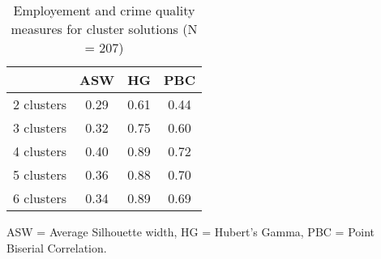 \begin{table}[htp]
\footnotesize
\setlength{\tabcolsep}{35pt}
\renewcommand{\arraystretch}{1.3}
\begin{threeparttable}
\centering
\caption{Employement and crime quality measures for cluster solutions (N = 207)} 
\label{tab:quality_clusters_job_crime}
\begin{tabular}{lccc}
  \hline
 & ASW & HG & PBC \\ 
  \hline
2 clusters & 0.29 & 0.61 & 0.44 \\ 
  3 clusters & 0.32 & 0.75 & 0.60 \\ 
  4 clusters & 0.40 & 0.89 & 0.72 \\ 
  5 clusters & 0.36 & 0.88 & 0.70 \\ 
  6 clusters & 0.34 & 0.89 & 0.69 \\ 
   \hline
\end{tabular}
\begin{tablenotes}
\scriptsize
\item ASW = Average Silhouette width, HG = Hubert's Gamma, PBC = Point Biserial Correlation.
\end{tablenotes}
\end{threeparttable}
\end{table}
